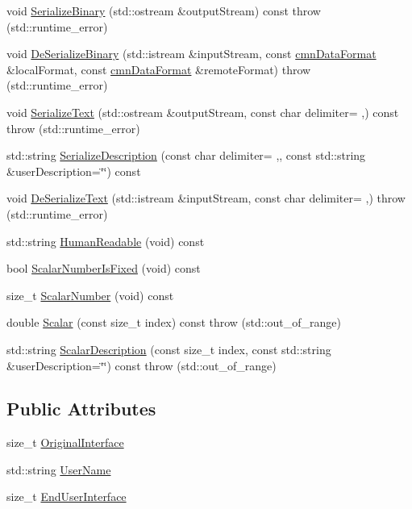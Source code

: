 \begin{DoxyCompactItemize}
\item 
void \hyperlink{classmts_end_user_interface_arg_a125a9e346d3687b334bd5747bf1246b4}{Serialize\+Binary} (std\+::ostream \&output\+Stream) const   throw (std\+::runtime\+\_\+error)
\item 
void \hyperlink{classmts_end_user_interface_arg_ab55a00b8c567da150de851c104485f76}{De\+Serialize\+Binary} (std\+::istream \&input\+Stream, const \hyperlink{classcmn_data_format}{cmn\+Data\+Format} \&local\+Format, const \hyperlink{classcmn_data_format}{cmn\+Data\+Format} \&remote\+Format)  throw (std\+::runtime\+\_\+error)
\item 
void \hyperlink{classmts_end_user_interface_arg_acd15e619df9ee960a31e40255d1d513d}{Serialize\+Text} (std\+::ostream \&output\+Stream, const char delimiter= \textquotesingle{},\textquotesingle{}) const   throw (std\+::runtime\+\_\+error)
\item 
std\+::string \hyperlink{classmts_end_user_interface_arg_af1d39679427e5893792730da7c43d2d1}{Serialize\+Description} (const char delimiter= \textquotesingle{},\textquotesingle{}, const std\+::string \&user\+Description=\char`\"{}\char`\"{}) const 
\item 
void \hyperlink{classmts_end_user_interface_arg_a7e9a4162c5cc043e2f8b7fa4abbd5e54}{De\+Serialize\+Text} (std\+::istream \&input\+Stream, const char delimiter= \textquotesingle{},\textquotesingle{})  throw (std\+::runtime\+\_\+error)
\item 
std\+::string \hyperlink{classmts_end_user_interface_arg_a77ad225702e52f4c013bb470f62936ff}{Human\+Readable} (void) const 
\item 
bool \hyperlink{classmts_end_user_interface_arg_a5e9fe2a42e555e206fcf0bc7f8323ff7}{Scalar\+Number\+Is\+Fixed} (void) const 
\item 
size\+\_\+t \hyperlink{classmts_end_user_interface_arg_afa2a1b6152a102d552e4e9c6467466ae}{Scalar\+Number} (void) const 
\item 
double \hyperlink{classmts_end_user_interface_arg_af3edfd53df02b3d327e8b806643b521e}{Scalar} (const size\+\_\+t index) const   throw (std\+::out\+\_\+of\+\_\+range)
\item 
std\+::string \hyperlink{classmts_end_user_interface_arg_ae653874248de9fa0e780e2fb8861fba9}{Scalar\+Description} (const size\+\_\+t index, const std\+::string \&user\+Description=\char`\"{}\char`\"{}) const   throw (std\+::out\+\_\+of\+\_\+range)
\end{DoxyCompactItemize}
\subsection*{Public Attributes}
\begin{DoxyCompactItemize}
\item 
size\+\_\+t \hyperlink{classmts_end_user_interface_arg_afcb9d3b4e1fa81a772d60480519232e6}{Original\+Interface}
\item 
std\+::string \hyperlink{classmts_end_user_interface_arg_a0698eac4ba5458816ef097e6094c1036}{User\+Name}
\item 
size\+\_\+t \hyperlink{classmts_end_user_interface_arg_a3eede0e50dd9601400c62f6d545ffa79}{End\+User\+Interface}
\end{DoxyCompactItemize}


